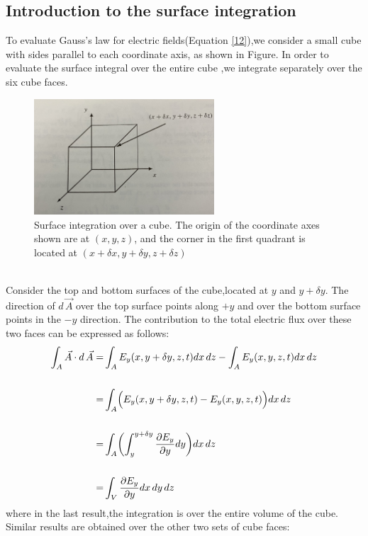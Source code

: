 \documentclass[12pt]{article}
\numberwithin{equation}{section}
\begin{document}
\subsection{Introduction to the surface integration}
To evaluate Gauss's law for electric fields(Equation \eqref{12}),we consider a small cube with sides parallel to each coordinate axis, as shown in Figure. In order to evaluate
the surface integral over the entire cube ,we integrate separately over the six cube faces.\\
\begin{figure}[h]
    \includegraphics[width=0.6\textwidth]{./pic/IMG_1366.jpeg}
    \centering
    \caption{Surface integration over a cube. The origin of the coordinate axes shown are at $(x,y,z)$, and the corner in the first quadrant is located at $(x+\delta x,y+\delta y,z+\delta z)$}
\end{figure}
\\
\indent Consider the top and bottom surfaces of the cube,located at $y$ and $y+\delta y$.
The direction of $d\,\vec{A}$ over the top surface points along $+y$ and over the bottom surface points in the $-y$ direction.
The contribution to the total electric flux over these two faces can be expressed as follows:
\[
    \begin{split}
        \int_A \vec{A}\cdot d\,\vec{A}=&\int_A E_y(x,y+\delta y,z,t)dx\,dz-\int_A E_y(x,y,z,t)dx\,dz\\
        \\
        =&\int_A \Bigl(E_y(x,y+\delta y,z,t)-E_y(x,y,z,t)\Bigl)dx\,dz\\
        \\
        =&\int_A \biggl(\int_{y}^{y+\delta y}\frac{\partial{E_y}}{\partial{y}}dy\biggl)dx\,dz\\
        \\
        =&\int_V \frac{\partial{E_y}}{\partial{y}}dx\,dy\,dz
    \end{split}
\]
where in the last result,the integration is over the entire volume of the cube. Similar results are obtained over the other two sets of cube faces:
\end{document}
